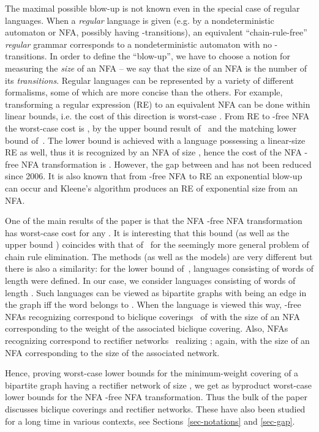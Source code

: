 \documentclass[submission]{llncs}
\begin{document}
  The maximal possible blow-up is not known even in the special case of regular languages.
  When a \emph{regular} language is given (e.g. by a
  nondeterministic automaton or NFA, possibly having -transitions), an equivalent ``chain-rule-free'' \emph{regular} grammar
  corresponds to a nondeterministic automaton with no -transitions. In order to define the ``blow-up'', we
  have to choose a notion for measuring the \emph{size} of an NFA -- we say that the size of an NFA is the number of its \emph{transitions}.
  Regular languages can be represented by a variety of different formalisms, some of which are more concise than the others.
  For example, transforming a regular expression (RE) to an equivalent NFA can be done within linear bounds, i.e. the cost of
  this direction is worst-case . From RE to -free NFA the worst-case cost is ,
  by the upper bound result of~\cite{Hromkovic:1997:TRE:646512.695338} and the matching lower bound of~\cite{Schnitger06regularexpressions}.
  The lower bound is achieved with a language possessing a linear-size RE as well, thus it is recognized by an NFA of size ,
  hence the cost of the NFA  -free NFA transformation is .
  However, the gap between  and  has not been reduced since 2006.
  It is also known that from -free NFA to RE an exponential blow-up can occur and Kleene's algorithm produces an
  RE of exponential size from an NFA.

  One of the main results of the paper is that the NFA  -free NFA transformation has worst-case cost 
  for any . It is interesting that this bound (as well as the upper bound )
  coincides with that of~\cite{Blum1983287} for the seemingly more general problem of chain rule elimination.
  The methods (as well as the models) are very different but there is also a similarity: for the lower bound of~\cite{Blum1983287},
  languages consisting of words of length  were defined. In our case, we consider languages consisting of words of length .
  Such languages  can be viewed as bipartite graphs  with  being an edge in the graph
  iff the word  belongs to . When the language is viewed this way, -free NFAs recognizing 
  correspond to biclique coverings~\cite{JuknaChapter2013} of 
  with the size of an NFA corresponding to the weight of the associated biclique covering.
  Also, NFAs recognizing  correspond to rectifier networks~\cite{JuknaChapter2013} realizing ;
  again, with the size of an NFA corresponding to the size of the associated network.

  Hence, proving worst-case lower bounds for the minimum-weight covering of a bipartite graph having a rectifier network of size ,
  we get as byproduct worst-case lower bounds for the NFA  -free NFA transformation.
  Thus the bulk of the paper discusses biclique coverings and rectifier networks. These have also been studied for a long time in
various contexts, see Sections~\ref{sec-notations} and \ref{sec-gap}.
\end{document}
